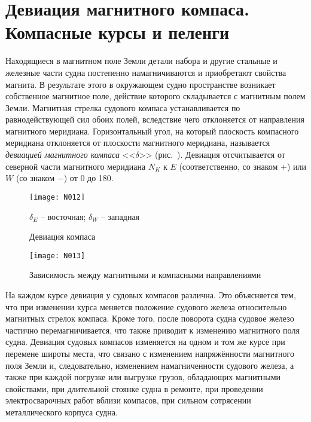 \section{Девиация магнитного компаса. Компасные курсы и пеленги} 

Находящиеся в магнитном поле Земли детали набора и другие стальные и
железные части судна постепенно намагничиваются и приобретают свойства
магнита. В результате этого в окружающем судно пространстве возникает
собственное магнитное поле, действие которого складывается с магнитным
полем Земли. Магнитная стрелка судового компаса устанавливается по
равнодействующей сил обоих полей, вследствие чего отклоняется от
направления магнитного меридиана. Горизонтальный угол, на который
плоскость компасного меридиана отклоняется от плоскости магнитного
меридиана, называется \textit{девиацией магнитного
  компаса} <<$\delta$>> (рис.~). Девиация
отсчитывается от северной части магнитного меридиана $N_K$ к $E$
(соответственно, со знаком $+$) или $W$ (со знаком $-$) от 0 до
180\gr.

\begin{figure}[htb]
  \centering{}
  \texttt{[image: N012]}
  \caption{Девиация компаса}
  \label{fig:N12}
  \small
  \centering{}
  $\delta_E$ \--- восточная; $\delta_W$ \--- западная
\end{figure}

\begin{figure*}[htb]
  \centering{}
  \texttt{[image: N013]}
  \caption{Зависимость между магнитными и компасными направлениями}
  \label{fig:N13}
\end{figure*}

На каждом курсе девиация у судовых компасов различна. Это объясняется
тем, что при изменении курса меняется положение судового железа
относительно магнитных стрелок компаса. Кроме того, после поворота
судна судовое железо частично перемагничивается, что также приводит к
изменению магнитного поля судна. Девиация судовых компасов изменяется
на одном и том же курсе при перемене широты места, что связано с
изменением напряжённости магнитного поля Земли и, следовательно,
изменением намагниченности судового железа, а также при каждой
погрузке или выгрузке грузов, обладающих магнитными свойствами, при
длительной стоянке судна в ремонте, при проведении электросварочных
работ вблизи компасов, при сильном сотрясении металлического корпуса
судна.

